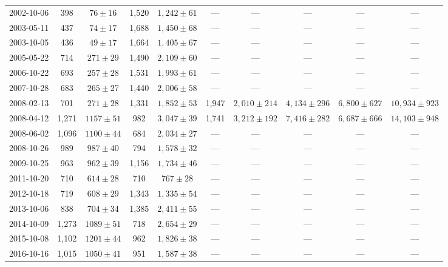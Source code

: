 \begin{landscape}
\begin{longtable}{cccccccccc}
{2002-10-06} & 398 & {$76  \pm  16$} & 1,520 & {$1,242 \pm 61$} & --- & --- & --- & --- & --- \\
{2003-05-11} & 437 & {$74  \pm  17$} & 1,688 & {$1,450 \pm 68$} & --- & --- & --- & --- & --- \\
{2003-10-05} & 436 & {$49  \pm  17$} & 1,664 & {$1,405 \pm 67$} & --- & --- & --- & --- & --- \\
{2005-05-22} & 714 & {$271  \pm  29$} & 1,490 & {$2,109 \pm 60$} & --- & --- & --- & --- & --- \\
{2006-10-22} & 693 & {$257  \pm  28$} & 1,531 & {$1,993 \pm 61$} & --- & --- & --- & --- & --- \\
{2007-10-28} & 683 & {$265  \pm  27$} & 1,440 & {$2,006 \pm 58$} & --- & --- & --- & --- & --- \\
{2008-02-13} & 701 & {$271  \pm  28$} & 1,331 & {$1,852 \pm 53$} & 1,947 & {$2,010 \pm 214$} & {$4,134 \pm 296$} & {$6,800 \pm 627$} & {$10,934 \pm 923$} \\
{2008-04-12} & 1,271 & {$1157  \pm  51$} & 982 & {$3,047 \pm 39$} & 1,741 & {$3,212 \pm 192$} & {$7,416 \pm 282$} & {$6,687 \pm 666$} & {$14,103 \pm 948$} \\
{2008-06-02} & 1,096 & {$1100  \pm  44$} & 684 & {$2,034 \pm 27$} & --- & --- & --- & --- & --- \\
{2008-10-26} & 989 & {$987  \pm  40$} & 794 & {$1,578 \pm 32$} & --- & --- & --- & --- & --- \\
{2009-10-25} & 963 & {$962  \pm  39$} & 1,156 & {$1,734 \pm 46$} & --- & --- & --- & --- & --- \\
{2011-10-20} & 710 & {$614  \pm  28$} & 710 & {$767 \pm 28$} & --- & --- & --- & --- & --- \\
{2012-10-18} & 719 & {$608  \pm  29$} & 1,343 & {$1,335 \pm 54$} & --- & --- & --- & --- & --- \\
{2013-10-06} & 838 & {$704  \pm  34$} & 1,385 & {$2,411 \pm 55$} & --- & --- & --- & --- & --- \\
{2014-10-09} & 1,273 & {$1089  \pm  51$} & 718 & {$2,654 \pm 29$} & --- & --- & --- & --- & --- \\
{2015-10-08} & 1,102 & {$1201  \pm  44$} & 962 & {$1,826 \pm 38$} & --- & --- & --- & --- & --- \\
{2016-10-16} & 1,015 & {$1050  \pm  41$} & 951 & {$1,587 \pm 38$} & --- & --- & --- & --- & --- \\
\end{longtable} 
\end{landscape} 
